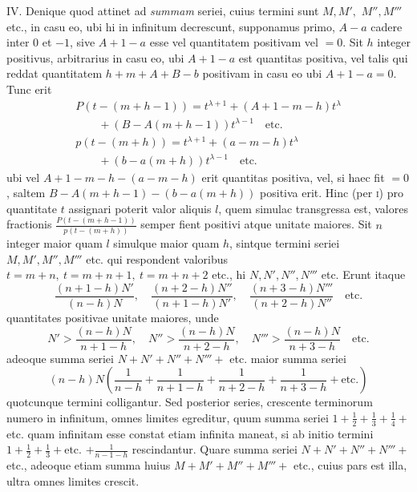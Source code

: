 IV. Denique quod attinet ad \textit{summam} seriei, cuius termini sunt $M,M',$ $M'',M'''$ etc., in casu eo, ubi hi in infinitum decrescunt, supponamus primo, $A-a$ cadere inter $0$ et $-1$, sive $A+1-a$ esse vel quantitatem positivam vel $=0$. Sit $h$ integer positivus, arbitrarius in casu eo, ubi $A+1-a$ est quantitas positiva, vel talis qui reddat quantitatem $h+m+A+B-b$ positivam in casu eo ubi $A+1-a=0$. Tunc erit
\[
\begin{array}{l}
P(t-(m+h-1))=t^{\lambda+1}+(A+1-m-h)t^\lambda\\\qquad{}+(B-A(m+h-1))t^{\lambda-1}\quad\mathrm{etc.}\\
p(t-(m+h))=t^{\lambda+1}+(a-m-h)t^\lambda\\\qquad{}+(b-a(m+h))t^{\lambda-1}\quad\mathrm{etc.}
\end{array}
\]
ubi vel $A+1-m-h-(a-m-h)$ erit quantitas positiva, vel, si haec fit $=0$, saltem $B-A(m+h-1)-(b-a(m+h))$ positiva erit. Hinc (per \textsc{i}) pro quantitate $t$ assignari poterit valor aliquis $l$, quem simulac transgressa est, valores fractionis $\frac{P(t-(m+h-1))}{p(t-(m+h))}$ semper fient positivi atque unitate maiores. Sit $n$ integer
maior quam $l$ simulque maior quam $h$, sintque termini seriei $M,M',M'',M'''$ etc. qui respondent valoribus $t=m+n,\ t=m+n+1,\ t=m+n+2$ etc., hi $N,N',N'',N'''$ etc. Erunt itaque
\[
\frac{(n+1-h)N'}{(n-h)N},\quad
\frac{(n+2-h)N''}{(n+1-h)N'},\quad
\frac{(n+3-h)N'''}{(n+2-h)N''}\quad\mathrm{etc.}
\]
quantitates positivae unitate maiores, unde
\[
N'>\frac{(n-h)N}{n+1-h},\quad
N''>\frac{(n-h)N}{n+2-h},\quad
N'''>\frac{(n-h)N}{n+3-h}\quad\mathrm{etc.}
\]
adeoque summa seriei $N+N'+N''+N'''+$ etc. maior summa seriei
\[
(n-h)N\left(\frac{1}{n-h}+\frac{1}{n+1-h}+\frac{1}{n+2-h}+\frac{1}{n+3-h}+\mathrm{etc.}\right)
\]
quotcunque termini colligantur. Sed posterior series, crescente terminorum numero in infinitum, omnes limites egreditur, quum summa seriei $1+\frac12+\frac13+\frac14+$ etc. quam infinitam esse constat etiam infinita maneat, si ab initio termini $1+\frac12+\frac13+\mathrm{etc.}$ $+\frac{1}{n-1-h}$ rescindantur. Quare summa seriei $N+N'+N''+N'''+$ etc., adeoque etiam summa huius $M+M'+M''+M'''+$ etc., cuius pars est illa, ultra omnes limites crescit.

